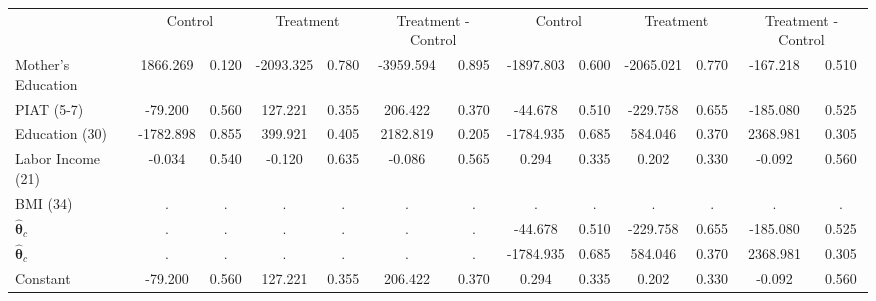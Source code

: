 \begin{tabular}{lcccccccccccc} \toprule
&\multicolumn{2}{c}{Control} & \multicolumn{2}{c}{Treatment} & \multicolumn{2}{c}{Treatment - Control} & \multicolumn{2}{c}{Control} & \multicolumn{2}{c}{Treatment} & \multicolumn{2}{c}{Treatment - Control} \\
Mother's Education &  1866.269 &     0.120 & -2093.325 &     0.780 & -3959.594 &     0.895 & -1897.803 &     0.600 & -2065.021 &     0.770 &  -167.218 &     0.510 \\  
PIAT (5-7) &   -79.200 &     0.560 &   127.221 &     0.355 &   206.422 &     0.370 &   -44.678 &     0.510 &  -229.758 &     0.655 &  -185.080 &     0.525 \\  
Education (30) & -1782.898 &     0.855 &   399.921 &     0.405 &  2182.819 &     0.205 & -1784.935 &     0.685 &   584.046 &     0.370 &  2368.981 &     0.305 \\  
Labor Income (21) &    -0.034 &     0.540 &    -0.120 &     0.635 &    -0.086 &     0.565 &     0.294 &     0.335 &     0.202 &     0.330 &    -0.092 &     0.560 \\  
BMI (34)  &         . &         . &         . &         . &         . &         . &         . &         . &         . &         . &         . &         . \\  
$\hat{\bm{\theta}}_c$ &         . &         . &         . &         . &         . &         . &   -44.678 &     0.510 &  -229.758 &     0.655 &  -185.080 &     0.525 \\  
$\hat{\bm{\theta}}_c$ &         . &         . &         . &         . &         . &         . & -1784.935 &     0.685 &   584.046 &     0.370 &  2368.981 &     0.305 \\  
Constant &   -79.200 &     0.560 &   127.221 &     0.355 &   206.422 &     0.370 &     0.294 &     0.335 &     0.202 &     0.330 &    -0.092 &     0.560 \\  
\hline \hline \end{tabular}
